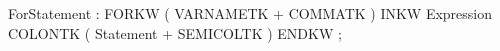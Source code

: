%
%
%
\begin{rail}
ForStatement : FORKW ( VARNAMETK + COMMATK ) INKW Expression
               COLONTK ( Statement + SEMICOLTK ) ENDKW
             ;
\end{rail}
